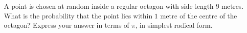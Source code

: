 A point is chosen at random inside a regular octagon with side length $9$ metres. What is the probability that the point lies within $1$ metre of the centre of the octagon? Express your answer in terms of $\pi$, in simplest radical form.
